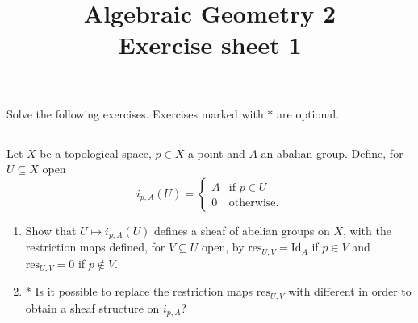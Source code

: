 \documentclass[11pt, reqno,a4paper, twoside]{amsproc}
\title{Algebraic Geometry 2\\Exercise sheet 1}
\newcommand{\res}{\mathrm{res}}
\newcommand{\id}{\mathrm{Id}}
\begin{document}
\maketitle

Solve the following exercises. Exercises marked with $*$ are optional.
\subsection{} Let $X$ be a topological space, $p\in X$ a point and $A$ an abalian group. Define, for $U\subseteq X$ open
\[i_{p,A}(U)=\begin{cases}
A&\text{if }p\in U\\0&\text{otherwise}.
\end{cases}\]
\begin{enumerate}
	\item 
	Show that $U\mapsto i_{p,A}(U)$ defines a sheaf of abelian groups on $X$, with the restriction maps defined, for $V\subseteq U$ open, by $\res_{U,V}=\id_A$ if $p\in V$ and $\res_{U,V}=0$ if $p\notin V$. 
	\item 
	* Is it possible to replace the restriction maps $\res_{U,V}$ with different in order to obtain a sheaf structure on $i_{p,A}$?
\end{enumerate}
\end{document}

